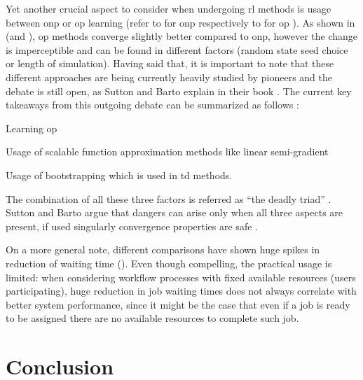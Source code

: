 \documentclass{seal_thesis}
\begin{document}
Yet another crucial aspect to consider when undergoing \gls{rl} methods is usage between \gls{onp} or \gls{op} learning (refer to  for \gls{onp} respectively to  for \gls{op} ). As shown in  (and ), \gls{op} methods converge slightly better compared to \gls{onp}, however the change is imperceptible and can be found in different factors (\eg random state seed choice or length of simulation). Having said that, it is important to note that these different approaches are being currently heavily studied by pioneers and the debate is still open, as Sutton and Barto explain in their book \cite[pp. 245-249]{Sutton2017}. The current key takeaways from this outgoing debate can be summarized as follows \cite{Sutton2017}:
\begin{enumerate*}
	\item Learning \gls{op}
	\item Usage of scalable function approximation methods like linear semi-gradient 
	\item Usage of bootstrapping which is used in \gls{td} methods.
\end{enumerate*}

The combination of all these three factors is referred as ``the deadly triad'' \cite[p. 249]{Sutton2017}. Sutton and Barto argue that dangers can arise only when all three aspects are present, if used singularly convergence properties are safe \cite[p. 249]{Sutton2017}.

On a more general note, different comparisons have shown huge spikes in reduction of waiting time (\eg {}). Even though compelling, the practical usage is limited: when considering workflow processes with fixed available resources (\ie users participating), huge reduction in job waiting times does not always correlate with better system performance, since it might be the case that even if a job is ready to be assigned there are no available resources to complete such job.


\glsresetall

\chapter{Conclusion}
\label{ch:conclusion}
\end{document}
